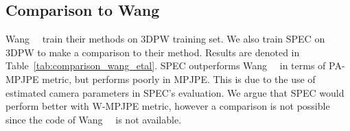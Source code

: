\documentclass[10pt,twocolumn,letterpaper,usenames,dvipsnames]{article}
\begin{document}
\begin{table}
    \centering
    \caption{Ablation experiments on \methodname with 3DPW validation set. $c$: using the image center as camera center; $f$ and $\camrot$: using \camcalib estimated focal length and camera rotation, respectively. All numbers are in \emph{mm}.}
    \label{tab:hmr_3dpw}
\end{table}

\begin{table}
    \centering
    \caption{Comparison to Wang~\etal~\cite{wang2020viewpoint}. Here both methods are trained with 3DPW training set for a fair comparison.}
    \label{tab:comparison_wang_etal}
\end{table}

\subsection{Comparison to Wang \etal~\cite{wang2020viewpoint}}
Wang~\etal~\cite{wang2020viewpoint} train their methods on 3DPW training set. We also train SPEC on 3DPW to make a comparison to their method. Results are denoted in Table~\ref{tab:comparison_wang_etal}. SPEC outperforms Wang~\etal~\cite{wang2020viewpoint} in terms of PA-MPJPE metric, but performs poorly in MPJPE. This is due to the use of estimated camera parameters in SPEC's evaluation. We argue that SPEC would perform better with W-MPJPE metric, however a comparison is not possible since the code of Wang~\etal~\cite{wang2020viewpoint} is not available.
\end{document}

